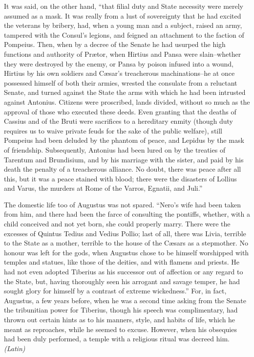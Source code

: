 It was said, on the other hand, ``that filial duty and State necessity were merely assumed as a mask. It was really from a lust of sovereignty that he had excited the veterans by bribery, had, when a young man and a subject, raised an army, tampered with the Consul's legions, and feigned an attachment to the faction of Pompeius. Then, when by a decree of the Senate he had usurped the high functions and authority of Prætor, when Hirtius and Pansa were slain--whether they were destroyed by the enemy, or Pansa by poison infused into a wound, Hirtius by his own soldiers and Cæsar's treacherous machinations--he at once possessed himself of both their armies, wrested the consulate from a reluctant Senate, and turned against the State the arms with which he had been intrusted against Antonius. Citizens were proscribed, lands divided, without so much as the approval of those who executed these deeds. Even granting that the deaths of Cassius and of the Bruti were sacrifices to a hereditary enmity (though duty requires us to waive private feuds for the sake of the public welfare), still Pompeius had been deluded by the phantom of peace, and Lepidus by the mask of friendship. Subsequently, Antonius had been lured on by the treaties of Tarentum and Brundisium, and by his marriage with the sister, and paid by his death the penalty of a treacherous alliance. No doubt, there was peace after all this, but it was a peace stained with blood; there were the disasters of Lollius and Varus, the murders at Rome of the Varros, Egnatii, and Juli.''

The domestic life too of Augustus was not spared. ``Nero's wife had been taken from him, and there had been the farce of consulting the pontiffs, whether, with a child conceived and not yet born, she could properly marry. There were the excesses of Quintus Tedius and Vedius Pollio; last of all, there was Livia, terrible to the State as a mother, terrible to the house of the Cæsars as a stepmother. No honour was left for the gods, when Augustus chose to be himself worshipped with temples and statues, like those of the deities, and with flamens and priests. He had not even adopted Tiberius as his successor out of affection or any regard to the State, but, having thoroughly seen his arrogant and savage temper, he had sought glory for himself by a contrast of extreme wickedness.'' For, in fact, Augustus, a few years before, when he was a second time asking from the Senate the tribunitian power for Tiberius, though his speech was complimentary, had thrown out certain hints as to his manners, style, and habits of life, which he meant as reproaches, while he seemed to excuse. However, when his obsequies had been duly performed, a temple with a religious ritual was decreed him. \emph{(Latin)}

